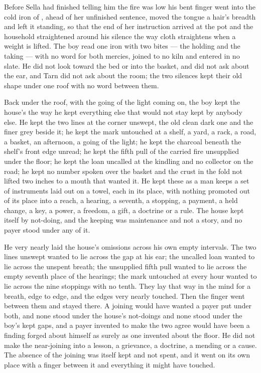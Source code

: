Before Sella had finished telling him the fire was low his bent finger went into the cold iron of , ahead of her unfinished sentence, moved the tongue a hair's breadth and left it standing, so that the end of her instruction arrived at the pot and the household straightened around his silence the way cloth straightens when a weight is lifted. The boy read one iron with two bites --- the holding and the taking --- with no  word for both mercies, joined to no kiln and entered in no slate. He did not look toward the bed or into the basket, and did not ask about the ear, and Tarn did not ask about the room; the two silences kept their old shape under one roof with no word between them.

\scenebreak

Back under the roof, with the going of the light coming on, the boy kept the house's  the way he kept everything else that would not stay kept by anybody else. He kept the two lines at the corner unswept, the old clean dark one and the finer grey beside it; he kept the mark untouched at a shelf, a yard, a rack, a road, a basket, an afternoon, a going of the light; he kept the charcoal beneath the shelf's front edge unread; he kept the fifth pull of the carried fire unsupplied under the floor; he kept the loan uncalled at the kindling and no collector on the road; he kept no number spoken over the basket and the crust in the fold not lifted two inches to a mouth that wanted it. He kept these as a man keeps a set of instruments laid out on a towel, each in its place, with nothing promoted out of its place into a reach, a hearing, a seventh, a stopping, a payment, a held change, a key, a power, a freedom, a gift, a doctrine or a rule. The house kept itself by not-doing, and the keeping was maintenance and not a story, and no payer stood under any of it.

He very nearly laid the house's omissions across his own empty intervals. The two lines unswept wanted to lie across the gap at his ear; the uncalled loan wanted to lie across the unspent breath; the unsupplied fifth pull wanted to lie across the empty seventh place of the hearings; the mark untouched at every hour wanted to lie across the nine stoppings with no tenth. They lay that way in the mind for a breath, edge to edge, and the edges very nearly touched. Then the finger went between them and stayed there. A joining would have wanted a payer put under both, and none stood under the house's not-doings and none stood under the boy's kept gaps, and a payer invented to make the two agree would have been a finding forged about himself as surely as one invented about the floor. He did not make the near-joining into a lesson, a grievance, a doctrine, a mending or a cause. The absence of the joining was itself kept and not spent, and it went on its own place with a finger between it and everything it might have touched.


